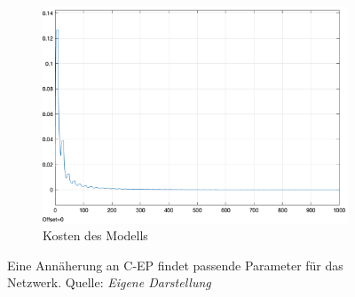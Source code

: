 \begin{figure}[h]
\begin{subfigure}[b]{0.3\textwidth}
    \includegraphics[width=\textwidth]{abbildungen/c_ep_approx_convergence_kosten.png}
    \caption{Kosten des Modells}
  \end{subfigure}
  \caption{Eine Annäherung an C-EP findet passende Parameter für das Netzwerk. Quelle: \textit{Eigene Darstellung}}
  \label{fig:C-EP Annäherung Konvergenz}
\end{figure}
